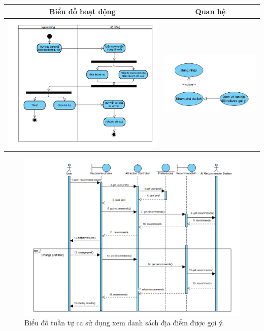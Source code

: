 \noindent 
\begin{tabular}{| c | c |}
    \hline
    \textbf{Biểu đồ hoạt động} & \textbf{Quan hệ} \\ 
    \hline
    \includegraphics[width=0.5\linewidth]{figures/c3/3-3-6-ad.png} 
    & 
    \includegraphics[width=0.45\linewidth]{figures/c3/3-3-6-rd.png} \\ 
    \hline
\end{tabular}



\begin{figure}[H]
    \centering  
    \includegraphics[width=1\textwidth]{figures/c3/3-3-6-sd.png}
    \caption{Biểu đồ tuần tự ca sử dụng xem danh sách địa điểm được gợi ý.}
    \label{fig:3-3-6-sequence-diagram}
\end{figure}